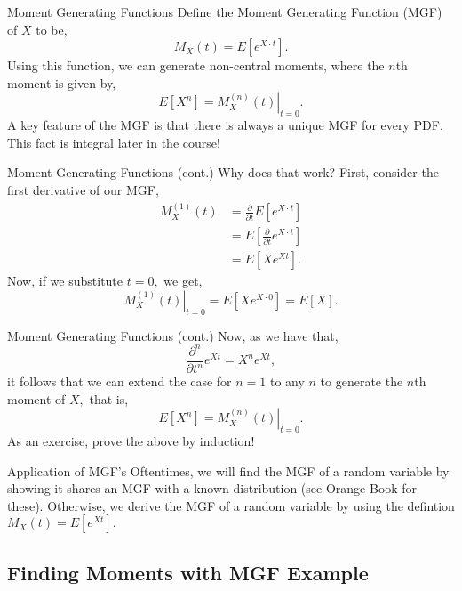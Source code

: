 \documentclass{beamer}
\begin{document}
\begin{frame}{Moment Generating Functions}
    Define the Moment Generating Function (MGF) of $X$ to be,
    $$
    M_X(t) = E\left[ e^{X\cdot t}\right].
    $$
    Using this function, we can generate non-central moments, where the $n$th moment is given by,
    $$
    E\left[ X^n \right] = \left. M_X^{(n)} (t) \right|_{t=0}.
    $$
    A key feature of the MGF is that there is always a unique MGF for every PDF. This fact is integral later in the course!
\end{frame}

\begin{frame}{Moment Generating Functions (cont.)}
    Why does that work?
    \newline\newline
    First, consider the first derivative of our MGF,
    \begin{align*}
        M_{X}^{(1)}(t) &= \frac{\partial}{\partial t} E\left[e^{X\cdot t}\right] \\
        &= E\left[ \frac{\partial}{\partial t} e^{X\cdot t} \right] \\
        &= E\left[ X e^{Xt} \right].
    \end{align*}
    Now, if we substitute $t=0,$ we get,
    $$ \left. M_{X}^{(1)}(t) \right|_{t=0} = E\left[X e^{X\cdot 0} \right] = E[X]. $$
\end{frame}

\begin{frame}{Moment Generating Functions (cont.)}
    Now, as we have that,
    $$
    \frac{\partial^n}{\partial t^n} e^{Xt} = X^n e^{Xt},
    $$
    it follows that we can extend the case for $n=1$ to any $n$ to generate the $n$th moment of $X,$ that is,
    $$E\left[ X^n \right] = \left. M_X^{(n)} (t) \right|_{t=0}.$$
    As an exercise, prove the above by induction!
\end{frame}

\begin{frame}{Application of MGF's}
    Oftentimes, we will find the MGF of a random variable by showing it shares an MGF with a known distribution (see Orange Book for these).
    \newline\newline
    Otherwise, we derive the MGF of a random variable by using the defintion $M_X(t) = E\left[e^{Xt}\right].$
\end{frame}

\subsection{Finding Moments with MGF Example}
\end{document}

